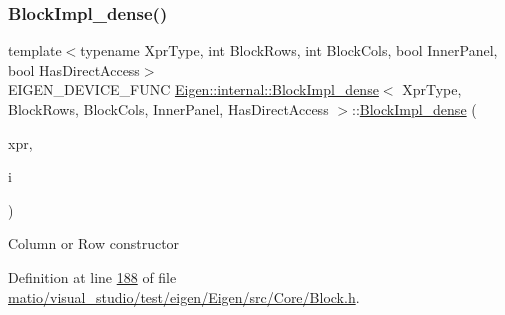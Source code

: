 \subsubsection{\texorpdfstring{Block\+Impl\+\_\+dense()}{BlockImpl\_dense()}\hspace{0.1cm}{\footnotesize\ttfamily [4/6]}}
{\footnotesize\ttfamily template$<$typename Xpr\+Type, int Block\+Rows, int Block\+Cols, bool Inner\+Panel, bool Has\+Direct\+Access$>$ \\
E\+I\+G\+E\+N\+\_\+\+D\+E\+V\+I\+C\+E\+\_\+\+F\+U\+NC \hyperlink{class_eigen_1_1internal_1_1_block_impl__dense}{Eigen\+::internal\+::\+Block\+Impl\+\_\+dense}$<$ Xpr\+Type, Block\+Rows, Block\+Cols, Inner\+Panel, Has\+Direct\+Access $>$\+::\hyperlink{class_eigen_1_1internal_1_1_block_impl__dense}{Block\+Impl\+\_\+dense} (\begin{DoxyParamCaption}\item[{Xpr\+Type \&}]{xpr,  }\item[{\hyperlink{namespace_eigen_a62e77e0933482dafde8fe197d9a2cfde}{Index}}]{i }\end{DoxyParamCaption})\hspace{0.3cm}{\ttfamily [inline]}}

Column or Row constructor 

Definition at line \hyperlink{matio_2visual__studio_2test_2eigen_2_eigen_2src_2_core_2_block_8h_source_l00188}{188} of file \hyperlink{matio_2visual__studio_2test_2eigen_2_eigen_2src_2_core_2_block_8h_source}{matio/visual\+\_\+studio/test/eigen/\+Eigen/src/\+Core/\+Block.\+h}.

\mbox{\label{class_eigen_1_1internal_1_1_block_impl__dense_aa77daae8d8aef85ce9445cfd23363cbf}} 
